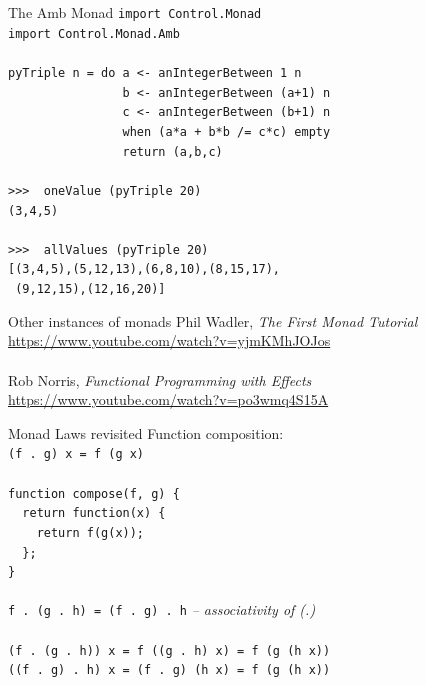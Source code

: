 \documentclass{beamer}
\newcommand{\prompt}{\phantom{}>\phantom{}>\phantom{}>\ }
\begin{document}
\begin{frame}{The Amb Monad} \pause
  \texttt{import Control.Monad \\
    import Control.Monad.Amb \\
    \ \\
    pyTriple n = do a <- anIntegerBetween 1 n \\
    \ \ \ \ \ \ \ \ \ \ \ \ \ \ \ \ b <- anIntegerBetween (a+1) n \\
    \ \ \ \ \ \ \ \ \ \ \ \ \ \ \ \ c <- anIntegerBetween (b+1) n \\
    \ \ \ \ \ \ \ \ \ \ \ \ \ \ \ \ when (a*a + b*b /= c*c) empty \\
    \ \ \ \ \ \ \ \ \ \ \ \ \ \ \ \ return (a,b,c) \\ 
  } \pause
  \ \\
  \texttt{\prompt{} oneValue (pyTriple 20)} \\ \pause
  \texttt{(3,4,5)} \\ \pause
  \ \\
  \texttt{\prompt{} allValues (pyTriple 20)} \\ \pause
  \texttt{[(3,4,5),(5,12,13),(6,8,10),(8,15,17),\\
      \ (9,12,15),(12,16,20)]}
\end{frame}

\begin{frame}{Other instances of monads}
  Phil Wadler, \textit{The First Monad Tutorial} \\
  \url{https://www.youtube.com/watch?v=yjmKMhJOJos} \\ \pause
  \ \\
  Rob Norris, \textit{Functional Programming with Effects} \\
  \url{https://www.youtube.com/watch?v=po3wmq4S15A}
\end{frame}

\begin{frame}{Monad Laws revisited}
  Function composition: \\ \pause
  \texttt{(f\ .\ g) x = f (g x)} \\ \pause
  \ \\
  \texttt{function compose(f, g) \{ \\
    \ \ return function(x) \{ \\
    \ \ \ \ return f(g(x)); \\
    \ \ \}; \\
    \} } \\ \pause
  \ \\
  \texttt{f\ .\ (g\ .\ h) = (f\ .\ g)\ .\ h}
  \pause \textit{-- associativity of (.)} \\ \pause
  \ \\
  \texttt{(f\ .\ (g\ .\ h)) x \pause = f ((g\ .\ h) x) \pause = f (g (h x))} \\ \pause
  \texttt{((f\ .\ g)\ .\ h) x \pause = (f\ .\ g) (h x) \pause = f (g (h x))} 
  
\end{frame}
\end{document}
